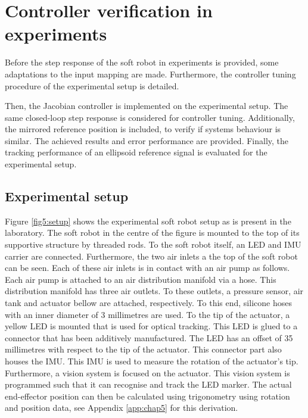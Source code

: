 \section{Controller verification in experiments}



Before the step response of the soft robot in experiments is provided, some adaptations to the input mapping are made. Furthermore, the controller tuning procedure of the experimental setup is detailed. 



Then, the Jacobian controller is implemented on the experimental setup. The same closed-loop step response is considered for controller tuning. Additionally, the mirrored reference position is included, to verify if systems behaviour is similar. The achieved results and error performance are provided. Finally, the tracking performance of an ellipsoid reference signal is evaluated for the experimental setup. 



\subsection*{Experimental setup}

Figure \ref{fig5:setup} shows the experimental soft robot setup as is present in the laboratory. The soft robot in the centre of the figure is mounted to the top of its supportive structure by threaded rods. To the soft robot itself, an LED and IMU carrier are connected. Furthermore, the two air inlets a the top of the soft robot can be seen. Each of these air inlets is in contact with an air pump as follows. Each air pump is attached to an air distribution manifold via a hose. This distribution manifold has three air outlets. To these outlets, a pressure sensor, air tank and actuator bellow are attached, respectively. To this end, silicone hoses with an inner diameter of 3 millimetres are used. To the tip of the actuator, a yellow LED is mounted that is used for optical tracking. This LED is glued to a connector that has been additively manufactured. The LED has an offset of 35 millimetres with respect to the tip of the actuator. This connector part also houses the IMU. This IMU is used to measure the rotation of the actuator's tip. Furthermore, a vision system is focused on the actuator. This vision system is programmed such that it can recognise and track the LED marker. The actual end-effector position can then be calculated using trigonometry using rotation and position data, see Appendix \ref{app:chap5} for this derivation.


